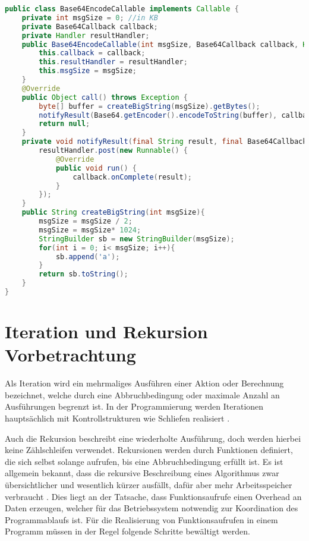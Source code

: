 \begin{lstlisting}[language=java,caption={Base64-Callable aus derEnergyEfficience App},label=lst:Base64Callable]
public class Base64EncodeCallable implements Callable {
    private int msgSize = 0; //in KB
    private Base64Callback callback;
    private Handler resultHandler;
    public Base64EncodeCallable(int msgSize, Base64Callback callback, Handler resultHandler){
        this.callback = callback;
        this.resultHandler = resultHandler;
        this.msgSize = msgSize;
    }
    @Override
    public Object call() throws Exception {
        byte[] buffer = createBigString(msgSize).getBytes();
        notifyResult(Base64.getEncoder().encodeToString(buffer), callback, resultHandler);
        return null;
    }
    private void notifyResult(final String result, final Base64Callback callback, final Handler resultHandler){
        resultHandler.post(new Runnable() {
            @Override
            public void run() {
                callback.onComplete(result);
            }
        });
    }
    public String createBigString(int msgSize){
        msgSize = msgSize / 2;
        msgSize = msgSize* 1024;
        StringBuilder sb = new StringBuilder(msgSize);
        for(int i = 0; i< msgSize; i++){
            sb.append('a');
        }
        return sb.toString();
    }
}
\end{lstlisting}

\section{Iteration und Rekursion Vorbetrachtung}

Als Iteration wird ein mehrmaliges Ausführen einer Aktion oder Berechnung bezeichnet, welche durch eine Abbruchbedingung oder maximale Anzahl an Ausführungen begrenzt ist. In der Programmierung werden Iterationen hauptsächlich mit Kontrollstrukturen wie Schliefen realisiert \cite{IterationUndRekursion}.

Auch die Rekursion beschreibt eine wiederholte Ausführung, doch werden hierbei keine Zählschleifen verwendet. Rekursionen werden durch Funktionen definiert, die sich selbst solange aufrufen, bis eine Abbruchbedingung erfüllt ist. Es ist allgemein bekannt, dass die rekursive Beschreibung eines Algorithmus zwar übersichtlicher und wesentlich kürzer ausfällt, dafür aber mehr Arbeitsspeicher verbraucht \cite{IterationUndRekursion}. Dies liegt an der Tatsache, dass Funktionsaufrufe einen Overhead an Daten  erzeugen, welcher für das Betriebssystem notwendig zur Koordination des Programmablaufs ist. Für die Realisierung von Funktionsaufrufen in einem Programm müssen in der Regel folgende Schritte bewältigt werden.


